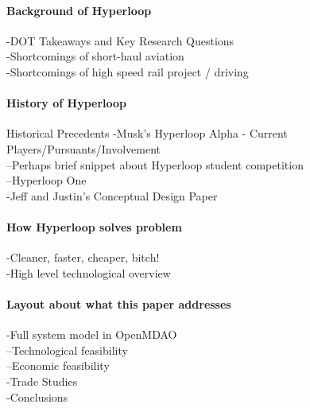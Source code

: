 \paragraph{Background of Hyperloop}
	-DOT Takeaways and Key Research Questions\\
	-Shortcomings of short-haul aviation\\
	-Shortcomings of high speed rail project / driving\\
\paragraph{History of Hyperloop}
	Historical Precedents
	-Musk’s Hyperloop Alpha - Current Players/Pursuants/Involvement\\
	--Perhaps brief snippet about Hyperloop student competition\\
	--Hyperloop One\\
	-Jeff and Justin’s Conceptual Design Paper\\
\paragraph{How Hyperloop solves problem}
	-Cleaner, faster, cheaper, bitch!\\
	-High level technological overview\\
\paragraph{Layout about what this paper addresses}
	-Full system model in OpenMDAO\\
	--Technological feasibility\\
	--Economic feasibility\\
	-Trade Studies\\
	-Conclusions\\
